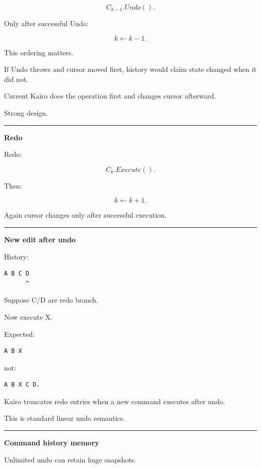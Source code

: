 \[
C_{k-1}.Undo().
\]

Only after successful Undo:

\[
k\leftarrow k-1.
\]

This ordering matters.

If Undo throws and cursor moved first, history would claim state changed when it did not.

Current Kairo does the operation first and changes cursor afterward.

Strong design.

\begin{center}\rule{0.5\linewidth}{0.5pt}\end{center}

\textbf{Redo}

Redo:

\[
C_k.Execute().
\]

Then:

\[
k\leftarrow k+1.
\]

Again cursor changes only after successful execution.

\begin{center}\rule{0.5\linewidth}{0.5pt}\end{center}

\textbf{New edit after undo}

History:

\begin{verbatim}
A B C D
      ^
\end{verbatim}

Suppose C/D are redo branch.

Now execute X.

Expected:

\begin{verbatim}
A B X
\end{verbatim}

not:

\begin{verbatim}
A B X C D.
\end{verbatim}

Kairo truncates redo entries when a new command executes after undo.

This is standard linear undo semantics.

\begin{center}\rule{0.5\linewidth}{0.5pt}\end{center}

\textbf{Command history memory}

Unlimited undo can retain huge snapshots.


